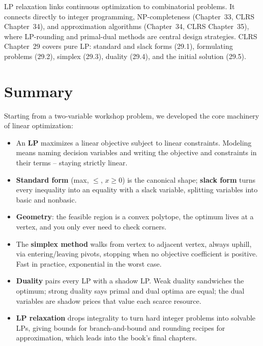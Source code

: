 \begin{focusbox}
LP relaxation links continuous optimization to combinatorial problems.
It connects directly to integer programming, NP-completeness (Chapter~33, CLRS
Chapter~34), and approximation algorithms (Chapter~34, CLRS Chapter~35), where
LP-rounding and primal-dual methods are central design strategies. CLRS
Chapter~29 covers pure LP: standard and slack forms (29.1), formulating problems
(29.2), simplex (29.3), duality (29.4), and the initial solution (29.5).
\end{focusbox}

\section{Summary}
\label{ch28:summary}

Starting from a two-variable workshop problem, we developed the core machinery
of linear optimization:

\begin{itemize}
\item An \textbf{LP} maximizes a linear objective subject to linear
  constraints. Modeling means naming decision variables and writing the
  objective and constraints in their terms -- staying strictly linear.
\item \textbf{Standard form} (max, $\le$, $x \ge 0$) is the canonical shape;
  \textbf{slack form} turns every inequality into an equality with a slack
  variable, splitting variables into basic and nonbasic.
\item \textbf{Geometry}: the feasible region is a convex polytope, the optimum
  lives at a vertex, and you only ever need to check corners.
\item The \textbf{simplex method} walks from vertex to adjacent vertex, always
  uphill, via entering/leaving pivots, stopping when no objective coefficient is
  positive. Fast in practice, exponential in the worst case.
\item \textbf{Duality} pairs every LP with a shadow LP. Weak duality sandwiches
  the optimum; strong duality says primal and dual optima are equal; the dual
  variables are shadow prices that value each scarce resource.
\item \textbf{LP relaxation} drops integrality to turn hard integer problems
  into solvable LPs, giving bounds for branch-and-bound and rounding recipes for
  approximation, which leads into the book's final chapters.
\end{itemize}

